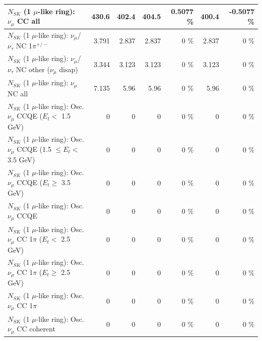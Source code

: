 \begin{table}
\begin{tabular}{| l | r | r | r  r | r  r |}
                                $N_{SK}$ (1 $\mu$-like ring): $\nu_{\mu}$ CC all &           430.6 &           402.4 &           404.5 &   0.5077 \%  &           400.4 &  -0.5077 \%  \\ 
\hline
              $N_{SK}$ (1 $\mu$-like ring): $\nu_\mu$/$\nu_\tau$ NC 1$\pi^{+/-}$ &           3.791 &           2.837 &           2.837 &        0 \%  &           2.837 &        0 \%  \\ 
   $N_{SK}$ (1 $\mu$-like ring): $\nu_\mu$/$\nu_\tau$ NC other ($\nu_\mu$ disap) &           3.344 &           3.123 &           3.123 &        0 \%  &           3.123 &        0 \%  \\ 
                                $N_{SK}$ (1 $\mu$-like ring): $\nu_{\mu}$ NC all &           7.135 &            5.96 &            5.96 &        0 \%  &            5.96 &        0 \%  \\ 
\hline
\hline
           $N_{SK}$ (1 $\mu$-like ring): Osc. $\nu_\mu$ CCQE ($E_{t} <$ 1.5 GeV) &               0 &               0 &               0 &        0 \%  &               0 &        0 \%  \\ 
  $N_{SK}$ (1 $\mu$-like ring): Osc. $\nu_\mu$ CCQE (1.5 $\leq E_{t} <$ 3.5 GeV) &               0 &               0 &               0 &        0 \%  &               0 &        0 \%  \\ 
        $N_{SK}$ (1 $\mu$-like ring): Osc. $\nu_\mu$ CCQE ($E_{t} \geq$ 3.5 GeV) &               0 &               0 &               0 &        0 \%  &               0 &        0 \%  \\ 
\hline
                               $N_{SK}$ (1 $\mu$-like ring): Osc. $\nu_\mu$ CCQE &               0 &               0 &               0 &        0 \%  &               0 &        0 \%  \\ 
\hline
      $N_{SK}$ (1 $\mu$-like ring): Osc. $\nu_\mu$ CC 1$\pi$ ($E_{t} <$ 2.5 GeV) &               0 &               0 &               0 &        0 \%  &               0 &        0 \%  \\ 
   $N_{SK}$ (1 $\mu$-like ring): Osc. $\nu_\mu$ CC 1$\pi$ ($E_{t} \geq$ 2.5 GeV) &               0 &               0 &               0 &        0 \%  &               0 &        0 \%  \\ 
\hline
                          $N_{SK}$ (1 $\mu$-like ring): Osc. $\nu_\mu$ CC 1$\pi$ &               0 &               0 &               0 &        0 \%  &               0 &        0 \%  \\ 
                        $N_{SK}$ (1 $\mu$-like ring): Osc. $\nu_\mu$ CC coherent &               0 &               0 &               0 &        0 \%  &               0 &        0 \%  \\ 

\end{tabular}
\end{table}
